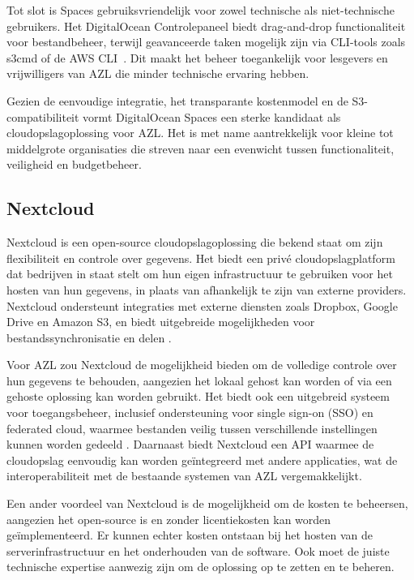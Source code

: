 Tot slot is Spaces gebruiksvriendelijk voor zowel technische als niet-technische gebruikers. Het DigitalOcean Controlepaneel biedt drag-and-drop functionaliteit voor bestandbeheer, terwijl geavanceerde taken mogelijk zijn via CLI-tools zoals s3cmd of de AWS CLI~\autocite{do_ui}. Dit maakt het beheer toegankelijk voor lesgevers en vrijwilligers van AZL die minder technische ervaring hebben.

Gezien de eenvoudige integratie, het transparante kostenmodel en de S3-compatibiliteit vormt DigitalOcean Spaces een sterke kandidaat als cloudopslagoplossing voor AZL. Het is met name aantrekkelijk voor kleine tot middelgrote organisaties die streven naar een evenwicht tussen functionaliteit, veiligheid en budgetbeheer.

\subsection{Nextcloud}
Nextcloud is een open-source cloudopslagoplossing die bekend staat om zijn flexibiliteit en controle over gegevens. Het biedt een privé cloudopslagplatform dat bedrijven in staat stelt om hun eigen infrastructuur te gebruiken voor het hosten van hun gegevens, in plaats van afhankelijk te zijn van externe providers. Nextcloud ondersteunt integraties met externe diensten zoals Dropbox, Google Drive en Amazon S3, en biedt uitgebreide mogelijkheden voor bestandssynchronisatie en delen \autocite{nextcloud_features}.

Voor AZL zou Nextcloud de mogelijkheid bieden om de volledige controle over hun gegevens te behouden, aangezien het lokaal gehost kan worden of via een gehoste oplossing kan worden gebruikt. Het biedt ook een uitgebreid systeem voor toegangsbeheer, inclusief ondersteuning voor single sign-on (SSO) en federated cloud, waarmee bestanden veilig tussen verschillende instellingen kunnen worden gedeeld \autocite{nextcloud_sso}. Daarnaast biedt Nextcloud een API waarmee de cloudopslag eenvoudig kan worden geïntegreerd met andere applicaties, wat de interoperabiliteit met de bestaande systemen van AZL vergemakkelijkt.

Een ander voordeel van Nextcloud is de mogelijkheid om de kosten te beheersen, aangezien het open-source is en zonder licentiekosten kan worden geïmplementeerd. Er kunnen echter kosten ontstaan bij het hosten van de serverinfrastructuur en het onderhouden van de software. Ook moet de juiste technische expertise aanwezig zijn om de oplossing op te zetten en te beheren.

